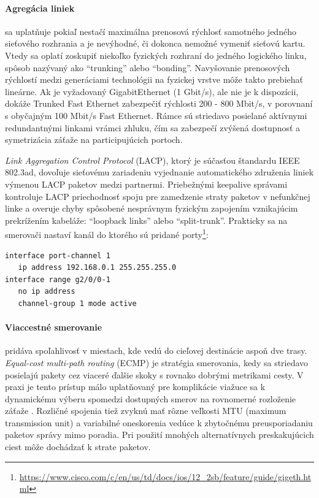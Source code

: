 \documentclass[12pt, a4paper]{article}
\begin{document}
\paragraph{Agregácia liniek} sa uplatňuje pokiaľ nestačí maximálna prenosová rýchlosť
samotného jedného sieťového rozhrania a je nevýhodné, či dokonca nemožné vymeniť sieťovú kartu.
Vtedy sa oplatí zoskupiť niekoľko fyzických rozhraní do jedného logického linku, spôsob nazývaný
ako \enquote{trunking} alebo \enquote{bonding}. Navyšovanie prenosových rýchlostí
medzi generáciami technológii na fyzickej vrstve môže takto prebiehať lineárne. Ak je vyžadovaný
GigabitEthernet (1 Gbit/s), ale nie je k dispozícii, dokáže Trunked Fast Ethernet
zabezpečiť rýchlosti 200 - 800 Mbit/s, v porovnaní s obyčajným 100 Mbit/s Fast Ethernet. 
Rámce sú striedavo posielané aktívnymi redundantnými linkami vrámci zhluku, čím
sa zabezpečí zvýšená dostupnosť a symetrizácia záťaže na participujúcich portoch.

\emph{Link Aggregation Control Protocol} (LACP), ktorý je súčasťou štandardu IEEE 802.3ad, dovoľuje 
sieťovému zariadeniu vyjednanie automatického združenia liniek výmenou LACP paketov medzi partnermi.
Priebežnými keepalive správami kontroluje LACP priechodnosť spoju pre zamedzenie straty paketov
v nefunkčnej linke a overuje chyby spôsobené nesprávnym fyzickým zapojením vznikajúcim prekrížením 
kabeláže: \enquote{loopback links} alebo \enquote{split-trunk}. Prakticky sa na smerovači nastaví kanál do 
ktorého sú pridané porty\footnote{\url{https://www.cisco.com/c/en/us/td/docs/ios/12_2sb/feature/guide/gigeth.html}}:
\begin{lstlisting}
interface port-channel 1
   ip address 192.168.0.1 255.255.255.0
interface range g2/0/0-1
   no ip address
   channel-group 1 mode active
\end{lstlisting}

\paragraph{Viaccestné smerovanie} pridáva spoľahlivosť v miestach, kde vedú do cieľovej destinácie aspoň
dve trasy. \emph{Equal-cost multi-path routing} (ECMP) je stratégia smerovania, kedy sa striedavo posielajú 
pakety cez viaceré ďalšie skoky s rovnako dobrými metrikami cesty. V praxi je tento prístup málo 
uplatňovaný pre komplikácie viažuce sa k dynamickému výberu spomedzi dostupných smerov na rovnomerné 
rozloženie záťaže \cite{RFC2991}. Rozličné spojenia tiež zvyknú mať rôzne veľkosti MTU (maximum transmission 
unit) a variabilné oneskorenia vedúce k zbytočnému preusporiadaniu paketov správy mimo poradia. Pri použití 
mnohých alternatívnych preskakujúcich ciest môže dochádzať k strate paketov. 
\end{document}
